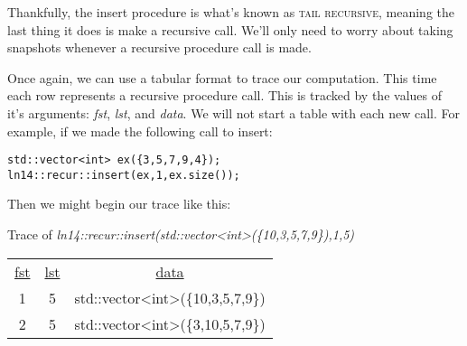 \documentclass[nobib]{tufte-handout}
\begin{document}
Thankfully, the insert procedure is what's known as \textsc{tail recursive}, meaning the last thing it does is make a recursive call. We'll only need to worry about taking snapshots whenever a recursive procedure call is made.

Once again, we can use a tabular format to trace our computation. This time each row represents a recursive procedure call. This is tracked by the values of it's arguments: \textit{fst}, \textit{lst}, and \textit{data}. We will not start a table with each new call. For example, if we made the following call to insert:

\begin{lstlisting}
std::vector<int> ex({3,5,7,9,4});
ln14::recur::insert(ex,1,ex.size());
\end{lstlisting}

Then we might begin our trace like this:

\begin{framed}
Trace of \textit{ln14::recur::insert(std::vector<int>(\{10,3,5,7,9\}),1,5)}
\begin{center}
\begin{tabular}{ccc}
  \underline{fst} & \underline{lst} & \underline{data} \\
  1 & 5 & std::vector<int>(\{10,3,5,7,9\}) \\
  2 & 5 & std::vector<int>(\{3,10,5,7,9\})
\end{tabular}
\end{center}
\end{framed}
\end{document}
